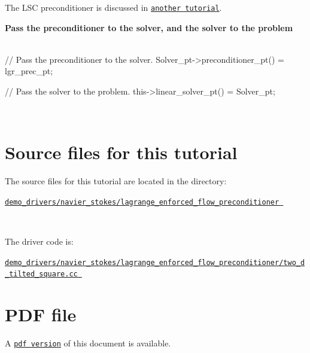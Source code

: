 \begin{DoxyEnumerate}
\begin{DoxyCodeInclude}
\end{DoxyCodeInclude}
 The L\+SC preconditioner is discussed in \href{../../lsc_navier_stokes/html/index.html}{\tt another tutorial}. ~\newline
~\newline

\item {\bfseries Pass the preconditioner to the solver, and the solver to the problem } ~\newline
~\newline
 
\begin{DoxyCodeInclude}
  \textcolor{comment}{// Pass the preconditioner to the solver.}
  Solver\_pt->preconditioner\_pt() = lgr\_prec\_pt;

  \textcolor{comment}{// Pass the solver to the problem.}
  this->linear\_solver\_pt() = Solver\_pt;

\end{DoxyCodeInclude}
 ~\newline
~\newline

\end{DoxyEnumerate}

 

\hypertarget{index_sources}{}\section{Source files for this tutorial}\label{index_sources}

\begin{DoxyItemize}
\item The source files for this tutorial are located in the directory\+:~\newline
~\newline
\begin{center} \href{../../../../demo_drivers/navier_stokes/lagrange_enforced_flow_preconditioner}{\tt demo\+\_\+drivers/navier\+\_\+stokes/lagrange\+\_\+enforced\+\_\+flow\+\_\+preconditioner } \end{center} ~\newline

\item The driver code is\+: ~\newline
~\newline
\begin{center} \href{../../../../demo_drivers/navier_stokes/lagrange_enforced_flow_preconditioner/two_d_tilted_square.cc}{\tt demo\+\_\+drivers/navier\+\_\+stokes/lagrange\+\_\+enforced\+\_\+flow\+\_\+preconditioner/two\+\_\+d\+\_\+tilted\+\_\+square.\+cc } \end{center} 
\end{DoxyItemize}



 

 \hypertarget{index_pdf}{}\section{P\+D\+F file}\label{index_pdf}
A \href{../latex/refman.pdf}{\tt pdf version} of this document is available. 
